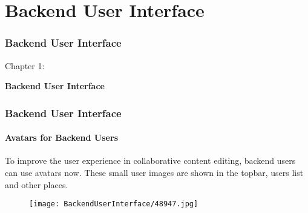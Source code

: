 %

\section{Backend User Interface}
\begin{frame}[fragile]
	\frametitle{Backend User Interface}

	\begin{center}\huge{Chapter 1:}\end{center}
	\begin{center}\huge{\color{typo3darkgrey}\textbf{Backend User Interface}}\end{center}

\end{frame}

\begin{frame}[fragile]
	\frametitle{Backend User Interface}
	\framesubtitle{Avatars for Backend Users}

	To improve the user experience in collaborative content editing, backend users can use avatars now.
	These small user images are shown in the topbar, users list and other places.

	\begin{figure}
		\texttt{[image: BackendUserInterface/48947.jpg]}
	\end{figure}

\end{frame}

